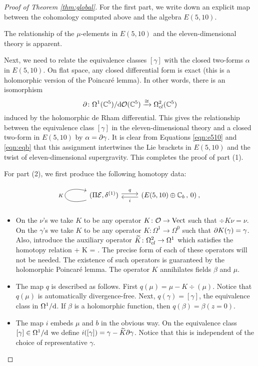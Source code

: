 \begin{proof}[Proof of Theorem \ref{thm:global}]
For the first part, we write down an explicit map between the cohomology computed above and the algebra $E(5,10)$. 

The relationship of the $\mu$-elements in $E(5,10)$ and the eleven-dimensional theory is apparent.

Next, we need to relate the equivalence classes $[\gamma]$ with the closed two-forms $\alpha$ in $E(5,10)$. 
On flat space, any closed differential form is exact (this is a holomorphic version of the Poincar\'e lemma). 
In other words, there is an isomorphism
\[
\partial \colon \Omega^1 (\mathbb C^5) / {\rm d} \mathcal O(\mathbb C^5) \xrightarrow{\cong} \Omega^{2}_{cl}(\mathbb C^5)
\]
induced by the holomorphic de Rham differential.
This gives the relationship between the equivalence class $[\gamma]$ in the eleven-dimensional theory and a closed two-form in $E(5,10)$ by $\alpha = \partial \gamma$. 
It is clear from Equations \eqref{eqn:e510} and \eqref{eqn:eqb} that this assignment intertwines the Lie brackets in $E(5,10)$ and the twist of eleven-dimensional supergravity. 
This completes the proof of part (1).

For part (2), we first produce the following homotopy data:
\begin{equation}
\begin{tikzcd}
\arrow[loop left]{l}{K}(\Pi \cE , \delta^{(1)})\arrow[r, shift left, "q"] &(E(5,10) \oplus \CC_b \, , \, 0)\arrow[l, shift left, "i"] \: ,
\end{tikzcd}
\end{equation}

\begin{itemize}
\item On the $\nu$'s we take $K$ to be any operator $K \colon \mathcal O \to {\rm Vect}$ such that $\div K \nu = \nu$. 
On the $\gamma$'s we take $K$ to be any operator $K \colon \Omega^1 \to \Omega^0$ such that $\partial K(\gamma) = \gamma$. 
Also, introduce the auxiliary operator $\widetilde{K} \colon \Omega^2_{cl} \to \Omega^1$ which satisfies the homotopy relation
\beqn\label{eqn:htpy1}
 \del \gamma + \del K \gamma = \gamma . 
\eeqn
The precise form of each of these operators will not be needed.
The existence of such operators is guaranteed by the holomorphic Poincar\'e lemma.
The operator $K$ annihilates fields $\beta$ and $\mu$. 
\item 
The map $q$ is described as follows. 
First $q(\mu) = \mu - K \div (\mu)$.
Notice that $q(\mu)$ is automatically divergence-free.
Next, $q(\gamma) = [\gamma]$, the equivalence class in $\Omega^1 / {\rm d}$. 
If $\beta$ is a holomorphic function, then $q(\beta) = \beta (z=0)$.
\item 
The map $i$ embeds $\mu$ and $b$ in the obvious way.
On the equivalence class $[\gamma] \in \Omega^1 / {\rm d}$ we define $i([\gamma]) = \gamma - \widetilde{K} \partial \gamma$. 
Notice that this is independent of the choice of representative $\gamma$. 
\end{itemize}


\end{proof}
